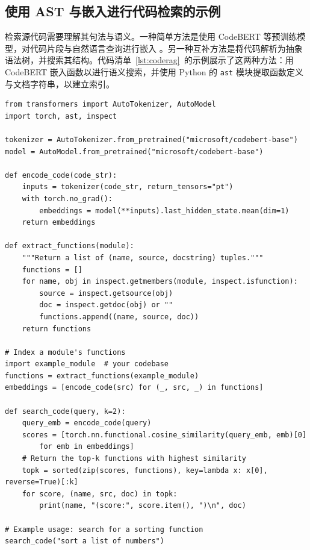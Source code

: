 \subsection{使用 AST 与嵌入进行代码检索的示例}

检索源代码需要理解其句法与语义。一种简单方法是使用 CodeBERT 等预训练模型，对代码片段与自然语言查询进行嵌入 \citep{feng2020codebert}。另一种互补方法是将代码解析为抽象语法树，并搜索其结构。代码清单~\ref{lst:coderag}~的示例展示了这两种方法：用 CodeBERT 嵌入函数以进行语义搜索，并使用 Python 的 \texttt{ast} 模块提取函数定义与文档字符串，以建立索引。


\begin{listing}[!ht]
\begin{verbatim}
from transformers import AutoTokenizer, AutoModel
import torch, ast, inspect

tokenizer = AutoTokenizer.from_pretrained("microsoft/codebert-base")
model = AutoModel.from_pretrained("microsoft/codebert-base")

def encode_code(code_str):
    inputs = tokenizer(code_str, return_tensors="pt")
    with torch.no_grad():
        embeddings = model(**inputs).last_hidden_state.mean(dim=1)
    return embeddings

def extract_functions(module):
    """Return a list of (name, source, docstring) tuples."""
    functions = []
    for name, obj in inspect.getmembers(module, inspect.isfunction):
        source = inspect.getsource(obj)
        doc = inspect.getdoc(obj) or ""
        functions.append((name, source, doc))
    return functions

# Index a module's functions
import example_module  # your codebase
functions = extract_functions(example_module)
embeddings = [encode_code(src) for (_, src, _) in functions]

def search_code(query, k=2):
    query_emb = encode_code(query)
    scores = [torch.nn.functional.cosine_similarity(query_emb, emb)[0] 
        for emb in embeddings]
    # Return the top-k functions with highest similarity
    topk = sorted(zip(scores, functions), key=lambda x: x[0], reverse=True)[:k]
    for score, (name, src, doc) in topk:
        print(name, "(score:", score.item(), ")\n", doc)

# Example usage: search for a sorting function
search_code("sort a list of numbers")
\end{verbatim}
\caption{Python 中基于代码的检索示例}
\label{lst:coderag}
\end{listing}


